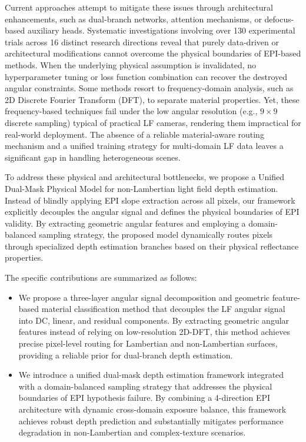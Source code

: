 \documentclass[lettersize,journal]{IEEEtran}
\begin{document}
Current approaches attempt to mitigate these issues through architectural enhancements, such as dual-branch networks, attention mechanisms, or defocus-based auxiliary heads. Systematic investigations involving over 130 experimental trials across 16 distinct research directions reveal that purely data-driven or architectural modifications cannot overcome the physical boundaries of EPI-based methods. When the underlying physical assumption is invalidated, no hyperparameter tuning or loss function combination can recover the destroyed angular constraints. Some methods resort to frequency-domain analysis, such as 2D Discrete Fourier Transform (DFT), to separate material properties. Yet, these frequency-based techniques fail under the low angular resolution (e.g., $9 \times 9$ discrete sampling) typical of practical LF cameras, rendering them impractical for real-world deployment. The absence of a reliable material-aware routing mechanism and a unified training strategy for multi-domain LF data leaves a significant gap in handling heterogeneous scenes.

To address these physical and architectural bottlenecks, we propose a Unified Dual-Mask Physical Model for non-Lambertian light field depth estimation. Instead of blindly applying EPI slope extraction across all pixels, our framework explicitly decouples the angular signal and defines the physical boundaries of EPI validity. By extracting geometric angular features and employing a domain-balanced sampling strategy, the proposed model dynamically routes pixels through specialized depth estimation branches based on their physical reflectance properties.

The specific contributions are summarized as follows:
\begin{itemize}
\item We propose a three-layer angular signal decomposition and geometric feature-based material classification method that decouples the LF angular signal into DC, linear, and residual components. By extracting geometric angular features instead of relying on low-resolution 2D-DFT, this method achieves precise pixel-level routing for Lambertian and non-Lambertian surfaces, providing a reliable prior for dual-branch depth estimation.
\item We introduce a unified dual-mask depth estimation framework integrated with a domain-balanced sampling strategy that addresses the physical boundaries of EPI hypothesis failure. By combining a 4-direction EPI architecture with dynamic cross-domain exposure balance, this framework achieves robust depth prediction and substantially mitigates performance degradation in non-Lambertian and complex-texture scenarios.
\end{itemize}
\end{document}
